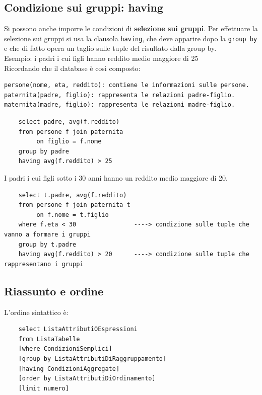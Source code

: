 \subsection{Condizione sui gruppi: having}
Si possono anche imporre le condizioni di \textbf{selezione sui gruppi}. Per effettuare la selezione sui gruppi si usa la clausola \texttt{having}, che deve apparire dopo la \texttt{group by} e che di fatto 
opera un taglio sulle tuple del risultato dalla group by.\\
\textcolor{verdeEsempio}{Esempio:} i padri i cui figli hanno reddito medio maggiore di 25\\
Ricordando che il database è così composto:
\begin{verbatim}
persone(nome, eta, reddito): contiene le informazioni sulle persone.
paternita(padre, figlio): rappresenta le relazioni padre-figlio.
maternita(madre, figlio): rappresenta le relazioni madre-figlio.
\end{verbatim}
\begin{verbatim}
    select padre, avg(f.reddito)
    from persone f join paternita
         on figlio = f.nome
    group by padre
    having avg(f.reddito) > 25
\end{verbatim}
\noindent I padri i cui figli sotto i 30 anni hanno un reddito medio
maggiore di 20.\\
\begin{verbatim}
    select t.padre, avg(f.reddito)
    from persone f join paternita t
         on f.nome = t.figlio
    where f.eta < 30                ----> condizione sulle tuple che vanno a formare i gruppi
    group by t.padre
    having avg(f.reddito) > 20      ----> condizione sulle tuple che rappresentano i gruppi 
\end{verbatim}

\subsection{Riassunto e ordine}
L'ordine sintattico è:
\begin{verbatim}
    select ListaAttributiOEspressioni
    from ListaTabelle
    [where CondizioniSemplici]
    [group by ListaAttributiDiRaggruppamento]
    [having CondizioniAggregate]
    [order by ListaAttributiDiOrdinamento]
    [limit numero]
\end{verbatim}

